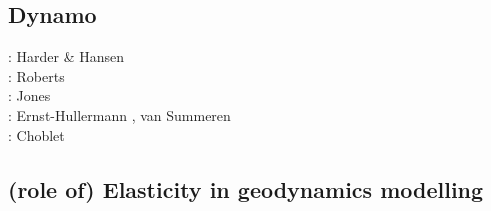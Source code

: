 \subsection{Dynamo}

\begin{scriptsize}
\twothousandfive: Harder \& Hansen \cite{haha05}\\
\twothousandnine: Roberts \etal \cite{rolm09}\\
\twothousandeleven: Jones \cite{jone11}\\
\twothousandthirteen: Ernst-Hullermann \etal \cite{erhh13}, van Summeren \etal \cite{vagc13}\\
\twothousandsixteen: Choblet \etal \cite{chah16}
\end{scriptsize}

\subsection{(role of) Elasticity in geodynamics modelling}

